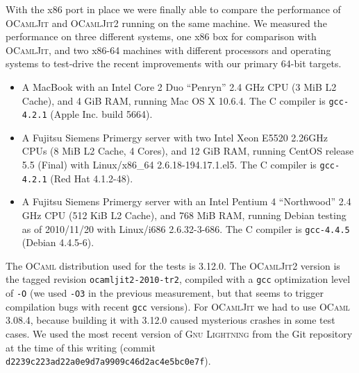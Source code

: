 \documentclass[12pt,a4paper,final]{article}
\begin{document}
With the x86 port in place we were finally able to compare the performance of
\textsc{OCamlJit} \cite{Starynkevitch04} and \textsc{OCamlJit2} running on the
same machine. We measured the performance on three different systems, one x86
box for comparison with \textsc{OCamlJit}, and two x86-64 machines with
different processors and operating systems to test-drive the recent improvements
with our primary 64-bit targets.
\begin{itemize}
\item A MacBook with an Intel Core 2 Duo ``Penryn'' 2.4 GHz CPU (3 MiB L2 Cache), and
  4 GiB RAM, running Mac OS X 10.6.4. The C compiler is \texttt{gcc-4.2.1} (Apple Inc.
  build 5664).
\item A Fujitsu Siemens Primergy server with two Intel Xeon E5520 2.26GHz CPUs (8 MiB L2 Cache, 4 Cores),
  and 12 GiB RAM, running CentOS release 5.5 (Final) with Linux/x86\_64 2.6.18-194.17.1.el5.
  The C compiler is \texttt{gcc-4.2.1} (Red Hat 4.1.2-48).
\item A Fujitsu Siemens Primergy server with an Intel Pentium 4 ``Northwood'' 2.4 GHz CPU (512 KiB L2 Cache),
  and 768 MiB RAM, running Debian testing as of 2010/11/20 with Linux/i686 2.6.32-3-686.
  The C compiler is \texttt{gcc-4.4.5} (Debian 4.4.5-6).
\end{itemize}
The \textsc{OCaml} distribution used for the tests is 3.12.0. The \textsc{OCamlJit2} version
is the tagged revision \texttt{ocamljit2-2010-tr2}, compiled with a \texttt{gcc} optimization
level of \texttt{-O} (we used \texttt{-O3} in the previous measurement, but that seems to
trigger compilation bugs with recent \texttt{gcc} versions). For \textsc{OCamlJit} we had to
use \textsc{OCaml} 3.08.4, because building it with 3.12.0 caused mysterious crashes in some
test cases. We used the most recent version of \textsc{Gnu Lightning} \cite{Bonzini10} from
the Git repository at the time of this writing (commit \texttt{d2239c223ad22a0e9d7a9909c46d2ac4e5bc0e7f}).
\end{document}
